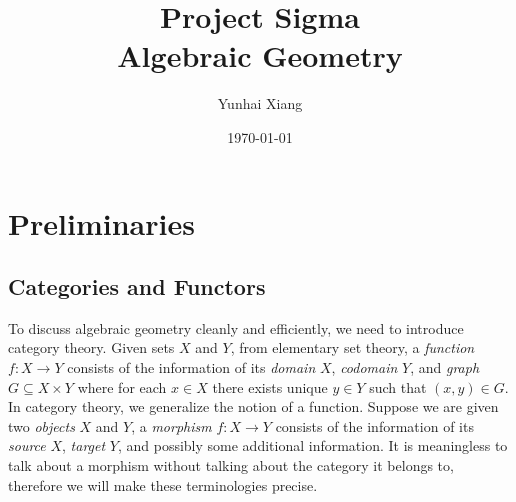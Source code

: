 \documentclass[11pt]{book}
\title{
\vspace{-2.0cm}
\Large{Project Sigma}\\
\vspace{1cm}
\huge{\bf{Algebraic Geometry}}
\vspace{3cm}}
\author{Yunhai Xiang}
\date{\today}
\begin{document}
\maketitle
\doublespacing
\tableofcontents
\singlespacing
\newpage
\chapter{Preliminaries}

\section{Categories and Functors}
To discuss algebraic geometry cleanly and efficiently, we need to introduce category theory. Given sets $X$ and $Y$, from elementary set theory, a \textit{function} $f:X\rightarrow Y$ consists of the information of its \textit{domain} $X$, \textit{codomain} $Y$, and \textit{graph} $G\subseteq X\times Y$ where for each $x\in X$ there exists unique $y\in Y$ such that $(x,y)\in G$. In category theory, we generalize the notion of a function. Suppose we are given two \textit{objects} $X$ and $Y$, a \textit{morphism} $f:X\rightarrow Y$ consists of the information of its \textit{source} $X$, \textit{target} $Y$, and possibly some additional information. It is meaningless to talk about a morphism without talking about the category it belongs to, therefore we will make these terminologies precise.
\end{document}
